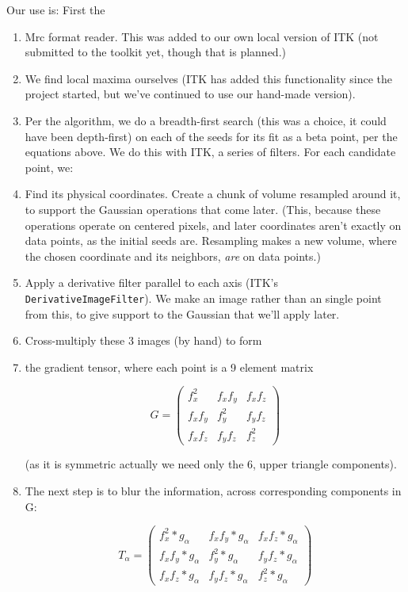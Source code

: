 \documentclass{article}
\begin{document}
Our use is: First the
\begin{enumerate}
\item Mrc format reader. This was added to our own local version of ITK (not submitted to the toolkit yet, though that is planned.)
\item We find local maxima ourselves (ITK has added this functionality since the project started, but we've continued to use our hand-made version).
\item Per the algorithm, we do a breadth-first search (this was a choice,
it could have been depth-first) on each of the seeds for its fit as a beta point,
per the equations above. We do this with ITK, a series of filters. For each
candidate point, we:
  \item Find its physical coordinates. Create a chunk of volume resampled
  around it, to support the Gaussian operations that come later.
  (This, because these operations operate on centered pixels, and later
  coordinates aren't exactly on data points, as the initial seeds are.
  Resampling makes a new volume, where the chosen coordinate and its neighbors,
  \emph{are} on data points.)
  \item Apply a derivative filter parallel to each axis (ITK's \texttt{DerivativeImageFilter}).
  We make an image rather than an single point from this, to give support
  to the Gaussian that we'll apply later.
  \item Cross-multiply these 3 images (by hand) to form
  \item the gradient tensor, where each point is a 9 element matrix

\[
  G =
\left( \begin{array}{ccc}
  f_{x}^2 & f_{x}f_{y} & f_{x}f_{z} \\
  f_{x}f_{y} & f_{y}^2 & f_{y}f_{z} \\
  f_{x}f_{z} & f_{y}f_{z} & f_{z}^2
\end{array} \right)
\]

  (as it is symmetric actually we need only the 6, upper triangle
  components).
  \item The next step is to blur the information, across
  corresponding components in G:

\[
  T_{\alpha} =
\left( \begin{array}{ccc}
  f_{x}^2*g_{\alpha} & f_{x}f_{y}*g_{\alpha} & f_{x}f_{z}*g_{\alpha} \\
  f_{x}f_{y}*g_{\alpha} & f_{y}^2*g_{\alpha} & f_{y}f_{z}*g_{\alpha} \\
  f_{x}f_{z}*g_{\alpha} & f_{y}f_{z}*g_{\alpha} & f_{z}^2*g_{\alpha}
\end{array} \right)
\]


\end{enumerate}
\end{document}
